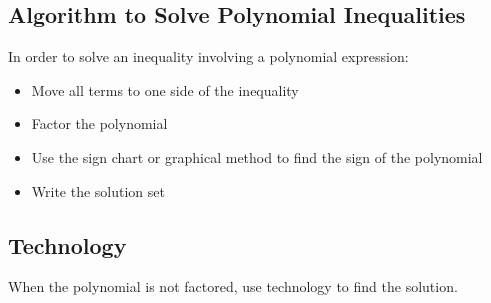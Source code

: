 		\subsection{Algorithm to Solve Polynomial Inequalities}
			In order to solve an inequality involving a polynomial expression:
			\begin{itemize}
				\item Move all terms to one side of the inequality
				\item Factor the polynomial
				\item Use the sign chart or graphical method to find the sign of the polynomial
				\item Write the solution set
			\end{itemize}
		\subsection{Technology}
			When the polynomial is not factored, use technology to find the solution.
